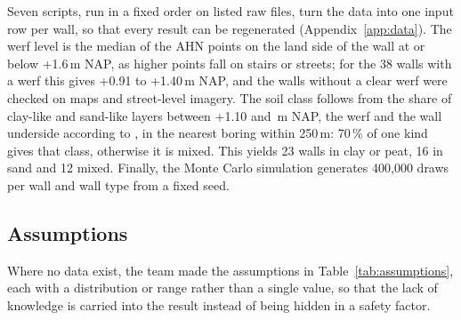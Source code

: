 Seven scripts, run in a fixed order on listed raw files, turn the data into one input row per wall, so that every result can be regenerated
(Appendix~\ref{app:data}). The werf
level is the median of the AHN points on the land side of the wall at or
below +1.6\,m NAP, as higher points fall on stairs or streets; for the 38
walls with a werf this gives +0.91 to +1.40\,m NAP, and the walls without a
clear werf were checked on maps and street-level imagery. The soil class
follows from the share of clay-like and sand-like layers between +1.10 and
\,m NAP, the werf and the wall underside according to
\textcite{erfgoed158}, in the nearest boring within 250\,m: 70\,\% of one kind
gives that class, otherwise it is mixed. This yields 23 walls in clay or peat,
16 in sand and 12 mixed. Finally, the Monte Carlo simulation generates
400{,}000 draws per wall and wall type from a fixed seed.

\subsection{Assumptions}\label{sec:data-assumptions}

Where no data exist, the team made the assumptions in
Table~\ref{tab:assumptions}, each with a distribution or range rather than a
single value, so that the lack of knowledge is carried into the result instead
of being hidden in a safety factor.

